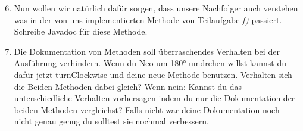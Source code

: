 \begin{enumerate}[label=\alph*)] \setcounter{enumi}{5}
    \item Nun wollen wir natürlich dafür sorgen, dass unsere Nachfolger auch verstehen was in der von uns implementierten Methode von 
    Teilaufgabe \textit{f)} passiert. Schreibe Javadoc für diese Methode.
    \item Die Dokumentation von Methoden soll überraschendes Verhalten bei der Ausführung verhindern. 
    Wenn du Neo um 180° umdrehen willst kannst du dafür jetzt turnClockwise und deine neue Methode benutzen. 
    Verhalten sich die Beiden Methoden dabei gleich?
    Wenn nein: Kannst du das unterschiedliche Verhalten vorhersagen indem du nur die Dokumentation der beiden Methoden vergleichst?
    Falls nicht war deine Dokumentation noch nicht genau genug du solltest sie nochmal verbessern.
\end{enumerate}
